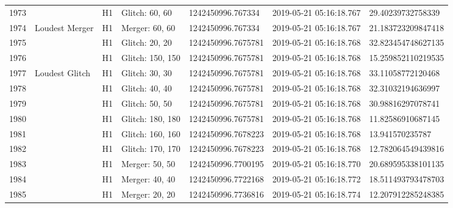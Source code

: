\begin{longtable}{lllllll}
1973 &                                                    &       H1 &    Glitch: 60, 60 &   1242450996.767334 &  2019-05-21 05:16:18.767 &   29.40239732758339 \\
1974 &                                     Loudest Merger &       H1 &    Merger: 60, 60 &   1242450996.767334 &  2019-05-21 05:16:18.767 &  21.183723209847418 \\
1975 &                                                    &       H1 &    Glitch: 20, 20 &  1242450996.7675781 &  2019-05-21 05:16:18.768 &  32.823454748627135 \\
1976 &                                                    &       H1 &  Glitch: 150, 150 &  1242450996.7675781 &  2019-05-21 05:16:18.768 &  15.259852110219535 \\
1977 &                                     Loudest Glitch &       H1 &    Glitch: 30, 30 &  1242450996.7675781 &  2019-05-21 05:16:18.768 &   33.11058772120468 \\
1978 &                                                    &       H1 &    Glitch: 40, 40 &  1242450996.7675781 &  2019-05-21 05:16:18.768 &   32.31032194636997 \\
1979 &                                                    &       H1 &    Glitch: 50, 50 &  1242450996.7675781 &  2019-05-21 05:16:18.768 &   30.98816297078741 \\
1980 &                                                    &       H1 &  Glitch: 180, 180 &  1242450996.7675781 &  2019-05-21 05:16:18.768 &   11.82586910687145 \\
1981 &                                                    &       H1 &  Glitch: 160, 160 &  1242450996.7678223 &  2019-05-21 05:16:18.768 &     13.941570235787 \\
1982 &                                                    &       H1 &  Glitch: 170, 170 &  1242450996.7678223 &  2019-05-21 05:16:18.768 &  12.782064549439816 \\
1983 &                                                    &       H1 &    Merger: 50, 50 &  1242450996.7700195 &  2019-05-21 05:16:18.770 &  20.689595338101135 \\
1984 &                                                    &       H1 &    Merger: 40, 40 &  1242450996.7722168 &  2019-05-21 05:16:18.772 &  18.511493793478703 \\
1985 &                                                    &       H1 &    Merger: 20, 20 &  1242450996.7736816 &  2019-05-21 05:16:18.774 &  12.207912285248385 \\

\end{longtable}
